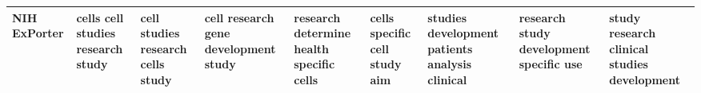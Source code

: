 \documentclass[11pt,a4paper]{article}
\begin{document}
\begin{appendices}
\begin{table*}[htp]
\begin{tiny}
\begin{tabular}{|p{}|p{}|p{}|p{}|p{}|p{}|p{}|p{}|p{}|}
NIH ExPorter & cells \newline cell \newline studies \newline research \newline study & cell \newline studies \newline research \newline cells \newline study & cell \newline research \newline gene \newline development \newline study & research \newline determine \newline health \newline specific \newline cells & cells \newline specific \newline cell \newline study \newline aim & studies \newline development \newline patients \newline analysis \newline clinical & research \newline study \newline development \newline specific \newline use & study \newline research \newline clinical \newline studies \newline development\\\hline

\end{tabular}
\end{tiny}
\end{table*}
\end{appendices}
\end{document}
